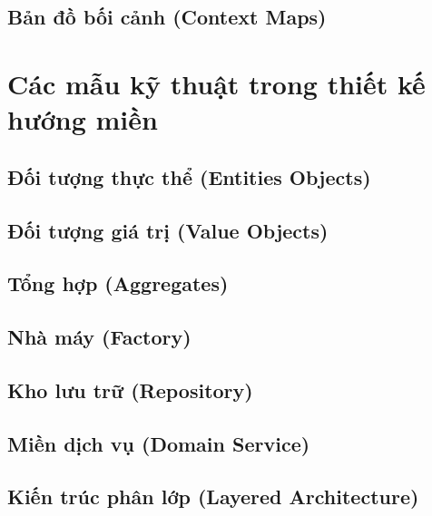 \documentclass{report} %
\begin{document}
\subsection{Bản đồ bối cảnh (Context Maps)}


\newpage
\section{Các mẫu kỹ thuật trong thiết kế hướng miền}

\subsection{Đối tượng thực thể (Entities Objects)}

\subsection{Đối tượng giá trị (Value Objects)}

\subsection{Tổng hợp (Aggregates)}

\subsection{Nhà máy (Factory)}

\subsection{Kho lưu trữ (Repository)}

\subsection{Miền dịch vụ (Domain Service)}

\subsection{Kiến trúc phân lớp (Layered Architecture)}

\end{document}
